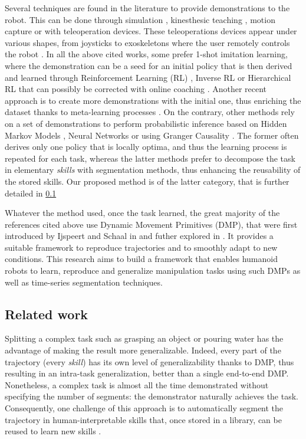 \documentclass[conference]{IEEEtran}
\begin{document}
Several techniques are found in the literature to provide demonstrations to the robot. This can be done through simulation \cite{sammut_learning_1992}, kinesthesic teaching \cite{wu_prim-lafd:_2022}, motion capture \cite{ramirez-amaro_understanding_2015} or with teleoperation devices. These teleoperations devices appear under various shapes, from joysticks \cite{ando_master-slave_2020} to exoskeletons where the user remotely controls the robot \cite{fang_skill_2019}. In all the above cited works, some prefer 1-shot imitation learning, where the demonstration can be a seed for an initial policy that is then derived and learned through Reinforcement Learning (RL) \cite{vecerik_practical_2019} \cite{stulp_reinforcement_2012}, Inverse RL \cite{rouot_inverse_2017} or Hierarchical RL \cite{zhao_variational_2023} that can possibly be corrected with online coaching \cite{advice_operator}. Another recent approach is to create more demonstrations with the initial one, thus enriching the dataset thanks to meta-learning processes \cite{yu_one-shot_2018}. On the contrary, other methods rely on a set of demonstrations to perform probabilistic inference based on Hidden Markov Models \cite{rana_towards_2017}, Neural Networks \cite{zhang_deep_2018} or using Granger Causality \cite{chuck2023grangercausal}. The former often derives only one policy that is locally optima, and thus the learning process is repeated for each task, whereas the latter methods prefer to decompose the task in elementary \textit{skills} with segmentation methods, thus enhancing the reusability of the stored skills. Our proposed method is of the latter category, that is further detailed in \ref{Approach}

Whatever the method used, once the task learned, the great majority of the references cited above use Dynamic Movement Primitives (DMP), that were first introduced by Ijspeert and Schaal in \cite{ijspeert_movement_2002} and futher explored in \cite{ijspeert_dynamical_2013}. It provides a suitable framework to reproduce trajectories and to smoothly adapt to new conditions. This research aims to build a framework that enables humanoid robots to learn, reproduce and generalize manipulation tasks using such DMPs as well as time-series segmentation techniques.

\subsection{Related work} \label{Approach}

Splitting a complex task such as grasping an object or pouring water has the advantage of making the result more generalizable. Indeed, every part of the trajectory (every \textit{skill}) has its own level of generalizability thanks to DMP, thus resulting in an intra-task generalization, better than a single end-to-end DMP. Nonetheless, a complex task is almost all the time demonstrated without specifying the number of segments: the demonstrator naturally achieves the task. Consequently, one challenge of this approach is to automatically segment the trajectory in human-interpretable skills that, once stored in a library, can be reused to learn new skills \cite{meier_movement_2011}.
\end{document}
